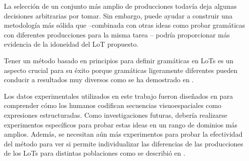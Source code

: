 
La selección de un conjunto más amplio de producciones todavía deja algunas decisiones arbitrarias por tomar. Sin embargo, puede ayudar a construir una metodología más sólida que --combinada con otras ideas como probar gramáticas con diferentes producciones para la misma tarea \cite{piantadosi2016logical}-- podría proporcionar más evidencia de la idoneidad del LoT propuesto.


Tener un método basado en principios para definir gramáticas en LoTs es un aspecto crucial para su éxito porque gramáticas ligeramente diferentes pueden conducir a resultados muy diversos como se ha demostrado en \cite{piantadosi2016logical}.


Los datos experimentales utilizados en este trabajo fueron diseñados en \cite{marie2016} para comprender cómo los humanos codifican secuencias visuoespaciales como expresiones estructuradas. Como investigaciones futuras, debería realizarse experimentos específicos para probar estas ideas en un rango de dominios más amplios. Además, se necesitan aún más experimentos para probar la efectividad del método para ver si permite individualizar las diferencias de las producciones de los LoTs para distintas poblaciones como se describió en .


